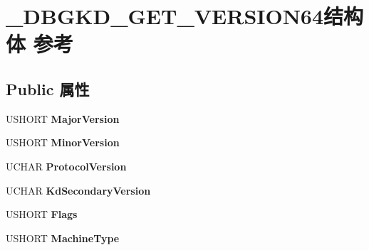 \hypertarget{struct___d_b_g_k_d___g_e_t___v_e_r_s_i_o_n64}{}\section{\+\_\+\+D\+B\+G\+K\+D\+\_\+\+G\+E\+T\+\_\+\+V\+E\+R\+S\+I\+O\+N64结构体 参考}
\label{struct___d_b_g_k_d___g_e_t___v_e_r_s_i_o_n64}
\subsection*{Public 属性}
\begin{DoxyCompactItemize}
\item 
\mbox{\label{struct___d_b_g_k_d___g_e_t___v_e_r_s_i_o_n64_a7e0b1ed9b376eebbe341f80d0fc3ea78}} 
U\+S\+H\+O\+RT {\bfseries Major\+Version}
\item 
\mbox{\label{struct___d_b_g_k_d___g_e_t___v_e_r_s_i_o_n64_ad659ac162460a98617f253484f2f2e26}} 
U\+S\+H\+O\+RT {\bfseries Minor\+Version}
\item 
\mbox{\label{struct___d_b_g_k_d___g_e_t___v_e_r_s_i_o_n64_a76ae5d639de39032854bc81ce03d9416}} 
U\+C\+H\+AR {\bfseries Protocol\+Version}
\item 
\mbox{\label{struct___d_b_g_k_d___g_e_t___v_e_r_s_i_o_n64_a9d76f6e4a67c1f3296b3c13bcbd730a2}} 
U\+C\+H\+AR {\bfseries Kd\+Secondary\+Version}
\item 
\mbox{\label{struct___d_b_g_k_d___g_e_t___v_e_r_s_i_o_n64_a3b7cba294497565760d1aedfc53371d6}} 
U\+S\+H\+O\+RT {\bfseries Flags}
\item 
\mbox{\label{struct___d_b_g_k_d___g_e_t___v_e_r_s_i_o_n64_a9dd5f45a079d663977ebc3b0de689cbb}} 
U\+S\+H\+O\+RT {\bfseries Machine\+Type}
\item 
\mbox{\label{struct___d_b_g_k_d___g_e_t___v_e_r_s_i_o_n64_ac2066aa4c676e02db96192643bebed9f}} 

\end{DoxyCompactItemize}
